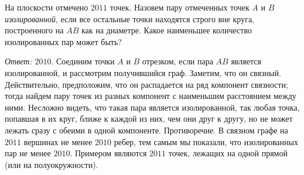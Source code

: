 На плоскости отмечено $2011$ точек.
Назовем пару отмеченных точек $A$ и $B$ \emph{изолированной}, если все остальные
точки находятся строго вне круга, построенного на $AB$ как на диаметре.
Какое наименьшее количество изолированных пар может быть?

\solution
\emph{Ответ:} $2010$.
Соединим точки $A$ и $B$ отрезком, если пара $AB$ является изолированной, и
рассмотрим получившийся граф.
Заметим, что он связный.
Действительно, предположим, что он распадается на ряд компонент связности;
тогда найдем пару точек из разных компонент с наименьшим расстоянием между
ними.
Несложно видеть, что такая пара является изолированной, так любая точка,
попавшая в их круг, ближе к каждой из них, чем они друг к другу, но не может
лежать сразу с обеими в одной компоненте.
Противоречие.
В связном графе на $2011$ вершинах не менее $2010$ ребер, тем самым мы
показали, что изолированных пар не менее $2010$.
Примером являются $2011$ точек, лежащих на одной прямой (или на
полуокружности).

